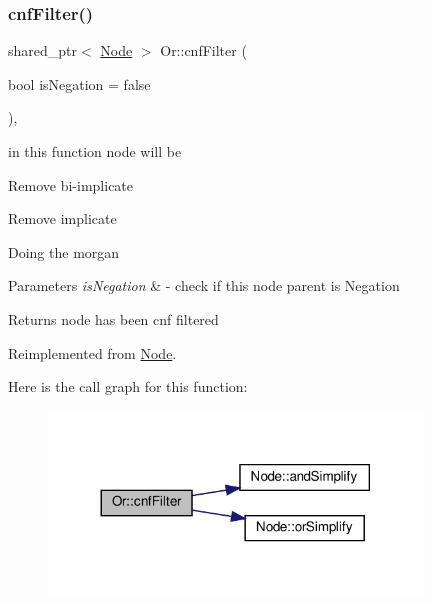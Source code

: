 \subsubsection{\texorpdfstring{cnf\+Filter()}{cnfFilter()}}
{\footnotesize\ttfamily shared\+\_\+ptr$<$ \hyperlink{class_node}{Node} $>$ Or\+::cnf\+Filter (\begin{DoxyParamCaption}\item[{bool}]{is\+Negation = {\ttfamily false} }\end{DoxyParamCaption})\hspace{0.3cm}{\ttfamily [override]}, {\ttfamily [virtual]}}



in this function node will be 


\begin{DoxyItemize}
\item Remove bi-\/implicate
\item Remove implicate
\item Doing the morgan 
\begin{DoxyParams}{Parameters}
{\em is\+Negation} & -\/ check if this node parent is Negation \\
\hline
\end{DoxyParams}
\begin{DoxyReturn}{Returns}
node has been cnf filtered 
\end{DoxyReturn}

\end{DoxyItemize}

Reimplemented from \hyperlink{class_node_ab5b01fd3c4efe0f2eaf7fc41653359b7}{Node}.

Here is the call graph for this function\+:\nopagebreak
\begin{figure}[H]
\begin{center}
\leavevmode
\includegraphics[width=281pt]{d8/d1b/class_or_ad8a208aee185d567ede5c92f39796faa_cgraph}
\end{center}
\end{figure}
\mbox{\label{class_or_a35728ed23db1ec805267d8d244629a62}} 
